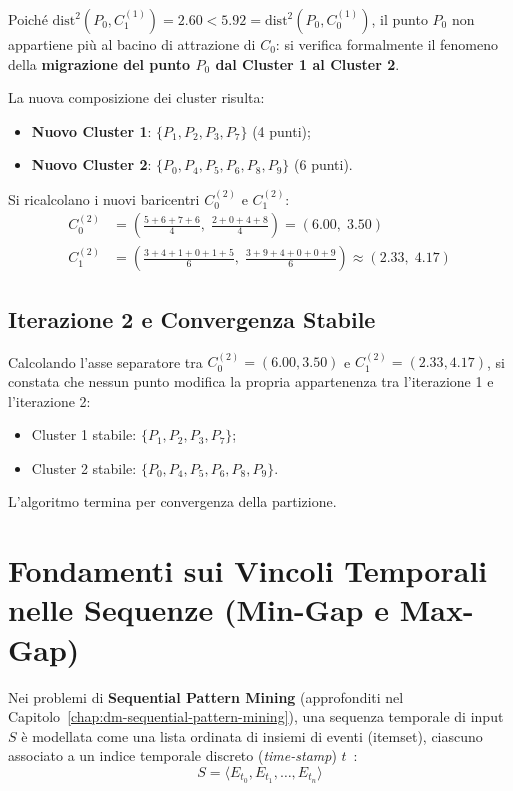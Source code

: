 Poiché $\mathrm{dist}^2(P_0, C_1^{(1)}) = 2.60 < 5.92 = \mathrm{dist}^2(P_0, C_0^{(1)})$, il punto $P_0$ non appartiene più al bacino di attrazione di $C_0$: si verifica formalmente il fenomeno della \textbf{migrazione del punto $P_0$ dal Cluster 1 al Cluster 2}.

La nuova composizione dei cluster risulta:
\begin{itemize}
    \item \textbf{Nuovo Cluster 1}: $\{P_1, P_2, P_3, P_7\}$ (4 punti);
    \item \textbf{Nuovo Cluster 2}: $\{P_0, P_4, P_5, P_6, P_8, P_9\}$ (6 punti).
\end{itemize}

Si ricalcolano i nuovi baricentri $C_0^{(2)}$ e $C_1^{(2)}$:
\begin{align}
C_0^{(2)} &= \left( \frac{5 + 6 + 7 + 6}{4}, \; \frac{2 + 0 + 4 + 8}{4} \right) = (6.00, \; 3.50) \\[4pt]
C_1^{(2)} &= \left( \frac{3 + 4 + 1 + 0 + 1 + 5}{6}, \; \frac{3 + 9 + 4 + 0 + 0 + 9}{6} \right) \approx (2.33, \; 4.17)
\end{align}

\FloatBarrier
\subsection{Iterazione 2 e Convergenza Stabile}
Calcolando l'asse separatore tra $C_0^{(2)} = (6.00, 3.50)$ e $C_1^{(2)} = (2.33, 4.17)$, si constata che nessun punto modifica la propria appartenenza tra l'iterazione 1 e l'iterazione 2:
\begin{itemize}
    \item Cluster 1 stabile: $\{P_1, P_2, P_3, P_7\}$;
    \item Cluster 2 stabile: $\{P_0, P_4, P_5, P_6, P_8, P_9\}$.
\end{itemize}
L'algoritmo termina per convergenza della partizione.


\FloatBarrier
\section{Fondamenti sui Vincoli Temporali nelle Sequenze (Min-Gap e Max-Gap)}
\label{sec:dm-seq-gap-constraints}

Nei problemi di \textbf{Sequential Pattern Mining} (approfonditi nel Capitolo~\ref{chap:dm-sequential-pattern-mining}), una sequenza temporale di input $S$ è modellata come una lista ordinata di insiemi di eventi (itemset), ciascuno associato a un indice temporale discreto (\textit{time-stamp}) $t$~\cite{tan2018, agrawal1995, srikant1996}:
\begin{equation}
S = \langle E_{t_0}, E_{t_1}, \dots, E_{t_n} \rangle
\end{equation}

